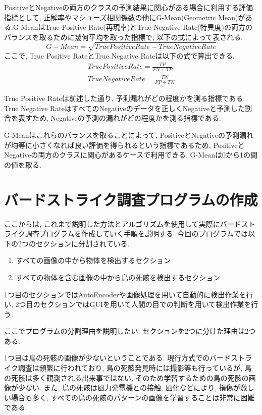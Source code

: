 \documentclass[dvipdfmx]{jsarticle}
\newcommand{\Add}[1]{\textcolor{red}{#1}}
\begin{document}
PositiveとNegativeの両方のクラスの予測結果に関心がある場合に利用する評価指標として, 正解率やマシューズ相関係数の他にG-Mean(Geometric Mean)がある.G-MeanはTrue Positive Rate(再現率)とTrue Negative Rate(特異度)の両方のバランスを取るために幾何平均を取った指標で, 以下の式によって表される.
\begin{equation}
    G-Mean = \sqrt{True Positive Rate - True Negative Rate}
\end{equation}
ここで, True Positive RateとTrue Negative Rateは以下の式で算出できる.
\begin{align}
  True Positive Rate = \frac{TP}{FN+TP} \label{1}  \\
  True Negative Rate = \frac{TN}{FP+TN} 
\end{align}

True Positive Rateは前述した通り, 予測漏れがどの程度かを測る指標である.
True Negative RateはすべてのNegativeのデータを正しくNegativeと予測した割合を表すため, Negativeの予測の漏れがどの程度かを測る指標である.

G-Meanはこれらのバランスを取ることによって, PositiveとNegativeの予測漏れが均等に小さくなれば良い評価を得られるという指標であるため, PositiveとNegativeの両方のクラスに関心があるケースで利用できる.
G-Meanは0から1の間の値を取る.

\section{バードストライク調査プログラムの作成}
ここからは, これまで説明した方法とアルゴリズムを使用して実際にバードストライク調査プログラムを作成していく手順を説明する.
今回のプログラムでは以下の2つのセクションに分割されている.
\begin{enumerate}
    \item すべての画像の中から物体を検出するセクション
    \item すべての物体を含む画像の中から鳥の死骸を検出するセクション
\end{enumerate}

1つ目のセクションではAutoEncoderや画像処理を用いて自動的に検出作業を行い, 2つ目のセクションではGUIを用いて人間の目での判断を用いて検出作業を行う.

ここでプログラムの分割理由を説明したい.
セクションを2つに分けた理由は2つある.

1つ目は鳥の死骸の画像が少ないということである.
現行方式でのバードストライク調査は頻繁に行われており, 鳥の死骸発見時には撮影等も行っているが, 
鳥の死骸は多く観測される出来事ではない, そのため学習するための鳥の死骸の画像が少ない.
また, 鳥の死骸は風力発電機との接触, 風化などにより, 損傷が激しい場合も多く, すべての鳥の死骸のパターンの画像を学習することは非常に困難である.
\end{document}
